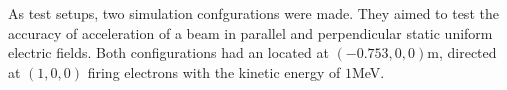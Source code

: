 \documentclass[a4paper,oneside,12pt]{report}
\numberwithin{equation}{chapter}
\begin{document}
As test setups, two simulation confgurations were made. They aimed to test the accuracy of acceleration of a beam in parallel and perpendicular static uniform electric fields.
Both configurations had an \egun located at $(-0.753, 0, 0)$m, directed at $(1, 0, 0)$ firing electrons with the kinetic energy of $1$MeV. 

\end{document}
